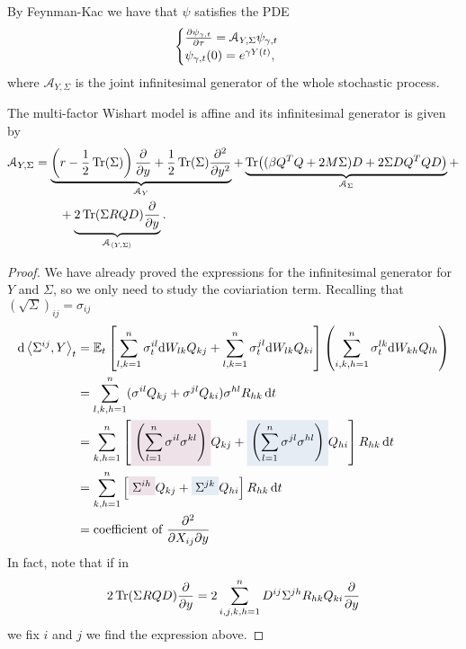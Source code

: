 By Feynman-Kac we have that $\psi$ satisfies the PDE
\begin{equation}
    \begin{cases}
        \pdv{\psi_{\gamma,t}}{\tau} = \mathcal{A}_{Y,\Sigma}\psi_{\gamma,t} \\
        \psi_{\gamma,t}(0) = e^{\gamma Y(t)},
    \end{cases}
\end{equation}
where $\mathcal{A}_{Y,\Sigma}$ is the joint infinitesimal generator of the whole stochastic process.
\begin{proposition}
    The multi-factor Wishart model is affine and its infinitesimal generator is given by
    \begin{align}
        \notag\mathcal{A}_{Y,\Sigma} &= \underbrace{\left(r-\frac{1}{2}\Tr(\Sigma)\right)\pdv{}{y} + \frac{1}{2}\Tr(\Sigma)\pdv[2]{}{y}}_{\mathcal{A}_Y} + \underbrace{\Tr((\beta Q^TQ + 2M\Sigma)D + 2\Sigma DQ^TQD)}_{\mathcal{A}_{\Sigma}} + \\
        &\qquad +
        \underbrace{2\Tr(\Sigma RQD)\pdv{}{y}}_{\mathcal{A}_{\expval{Y,\Sigma}}}. %
    \end{align}
\end{proposition}
\begin{proof}
    We have already proved the expressions for the infinitesimal generator for $Y$ and $\Sigma$, so we only need to study the coviariation term. Recalling that $(\sqrt{\Sigma})_{ij} = \sigma_{ij}$
    \begin{align*}
        \dd\expval{\Sigma^{ij},Y}_t &= \mathbb{E}_t\left[\sum_{l,k =1}^n\sigma_t^{il}\dd W_{lk}Q_{kj} + \sum_{l,k =1}^n\sigma_t^{jl}\dd W_{lk}Q_{ki}\right]\left(\sum_{i,k,h=1}^n \sigma_t^{lk}\dd W_{kh}Q_{lh}\right) \\
        &=
        \sum_{l,k,h=1}^n (\sigma^{il}Q_{kj}+\sigma^{jl}Q_{ki})\sigma^{hl}R_{hk}\,\dd t \\
        &=
        \sum_{k,h=1}^n\left[\hlc{mypink}{\left(\sum_{l=1}^n \sigma^{il}\sigma^{kl}\right)}Q_{kj} + \hlc{mylightblue}{\left(\sum_{l=1}^n \sigma^{jl}\sigma^{hl}\right)}Q_{hi}\right]R_{hk}\,\dd t \\
        &=
        \sum_{k,h=1}^n\left[\hlc{mypink}{\Sigma^{ih}}Q_{kj} + \hlc{mylightblue}{\Sigma^{jk}}Q_{hi}\right]R_{hk}\,\dd t \\
        &=
        \text{coefficient of } \pdv{}{X_{ij}}{y}
    \end{align*}
    In fact, note that if in
    \begin{align*}
        2\Tr(\Sigma RQD)\pdv{}{y} = 2\sum_{i,j,k,h=1}^n D^{ij}\Sigma^{jh}R_{hk}Q_{ki}\pdv{}{y}
    \end{align*}
    we fix $i$ and $j$ we find the expression above.
\end{proof}
